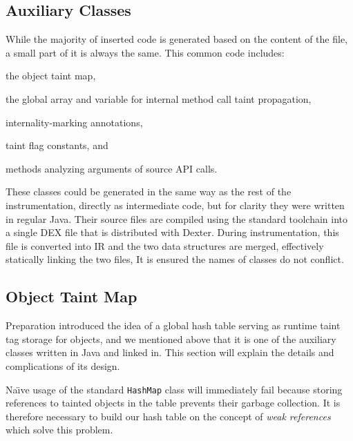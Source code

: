 \documentclass[12pt,twoside,notitlepage]{report}
\begin{document}
\label{section:Code_MethodEntering}

\subsection{Auxiliary Classes}

While the majority of inserted code is generated based on the content of the file, a small part of it is always the same. This common code includes:
\begin{inparaenum}[(i)]
\item the object taint map,
\item the global array and variable for internal method call taint propagation,
\item internality-marking annotations,
\item taint flag constants, and
\item methods analyzing arguments of source API calls.
\end{inparaenum}

These classes could be generated in the same way as the rest of the instrumentation, directly as intermediate code, but for clarity they were written in regular Java. Their source files are compiled using the standard toolchain into a single DEX file that is distributed with Dexter. During instrumentation, this file is converted into IR and the two data structures are merged, effectively statically linking the two files, It is ensured the names of classes do not conflict.

\subsection{Object Taint Map}
\label{section:Code_ObjectTaintMap}

Preparation introduced the idea of a global hash table serving as runtime taint tag storage for objects, and we mentioned above that it is one of the auxiliary classes written in Java and linked in. This section will explain the details and complications of its design.

Na\"{\i}ve usage of the standard \verb$HashMap$ class will immediately fail because storing references to tainted objects in the table prevents their garbage collection. It is therefore necessary to build our hash table on the concept of \emph{weak references} which solve this problem. 
\end{document}
